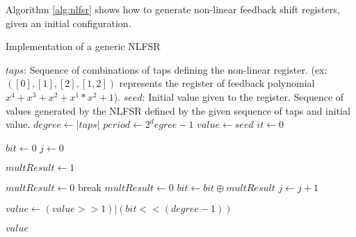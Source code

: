 \documentclass{llncs}
\begin{document}
Algorithm \ref{alg:nlfsr} shows how to generate non-linear feedback shift registers, given an initial configuration.

\begin{algorithm}[ht]
  \caption{Implementation of a generic NLFSR}\label{alg:nlfsr}
  \begin{algorithmic}[1]
    \Require
      \Statex $taps$: Sequence of combinations of taps defining the non-linear register. (ex: $([0],[1],[2],[1,2])$ represents the register of feedback polynomial $x^4 + x^3 + x^2  + x^1*x^2 + 1$).
      \Statex $seed$: Initial value given to the register.
    \Ensure
      \Statex Sequence of values generated by the NLFSR defined by the given sequence of taps and initial value.
    \Statex
    \State $degree \gets |taps|$ 
    \State $period \gets 2^degree - 1$ 
    \State $value \gets seed$ 
    \State $it \gets 0$
    
        \State $bit \gets 0$
        \State $j \gets 0$
            
        		\State $multResult \gets 1$
                
                    	\State $multResult \gets 0$
                        \State break
                    \EndIf
                \EndFor
            \Else
            	\State $multResult \gets 0$
            \EndIf
            \State $bit \gets bit \oplus multResult$ 
            \State $j \gets j+1$
    	\EndFor
        
        \State $value \gets (value >> 1) | (bit << (degree-1))$
        
        \Return $value$ 
    \EndWhile
  \end{algorithmic}
\end{algorithm}
\end{document}
